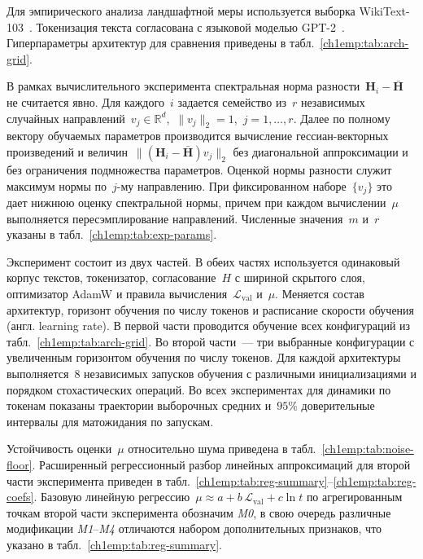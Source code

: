 Для эмпирического анализа ландшафтной меры используется выборка WikiText-103~\cite{merity2016pointer}.
Токенизация текста согласована с языковой моделью GPT-2~\cite{radford2019language}.
Гиперпараметры архитектур для сравнения приведены в табл.~\ref{ch1emp:tab:arch-grid}.

В рамках вычислительного эксперимента спектральная норма разности~$\mathbf{H}_i-\bar{\mathbf{H}}$ не считается явно. Для каждого~$i$ задается семейство из~$r$ независимых случайных направлений~$v_j\in\mathbb{R}^d$,~$\|v_j\|_2=1$,~$j=1,\ldots,r$.
Далее по полному вектору обучаемых параметров производится вычисление гессиан-векторных произведений и величин~$\|(\mathbf{H}_i-\bar{\mathbf{H}})v_j\|_2$ без диагональной аппроксимации и без ограничения подмножества параметров.
Оценкой нормы разности служит максимум нормы по~$j$-му направлению.
При фиксированном наборе~$\{v_j\}$ это дает нижнюю оценку спектральной нормы, причем при каждом вычислении~$\mu$ выполняется пересэмплирование направлений.
Численные значения~$m$ и~$r$ указаны в табл.~\ref{ch1emp:tab:exp-params}.

Эксперимент состоит из двух частей.
В обеих частях используется одинаковый корпус текстов, токенизатор, согласование~$H$ с шириной скрытого слоя, оптимизатор AdamW и правила вычисления~$\mathcal{L}_{\mathrm{val}}$ и~$\mu$.
Меняется состав архитектур, горизонт обучения по числу токенов и расписание скорости обучения (англ. learning rate).
В первой части проводится обучение всех конфигураций из табл.~\ref{ch1emp:tab:arch-grid}.
Во второй части~--- три выбранные конфигурации с увеличенным горизонтом обучения по числу токенов.
Для каждой архитектуры выполняется~$8$ независимых запусков обучения с различными инициализациями и порядком стохастических операций.
Во всех экспериментах для динамики по токенам показаны траектории выборочных средних и~$95\%$ доверительные интервалы для матожидания по запускам.

Устойчивость оценки~$\mu$ относительно шума приведена в табл.~\ref{ch1emp:tab:noise-floor}.
Расширенный регрессионный разбор линейных аппроксимаций для второй части эксперимента приведен в табл.~\ref{ch1emp:tab:reg-summary}--\ref{ch1emp:tab:reg-coefs}.
Базовую линейную регрессию~$\mu\approx a+b\,\mathcal{L}_{\mathrm{val}}+c\ln t$ по агрегированным точкам второй части эксперимента обозначим \emph{M0}, в свою очередь различные модификации \emph{M1}--\emph{M4} отличаются набором дополнительных признаков, что указано в табл.~\ref{ch1emp:tab:reg-summary}.

